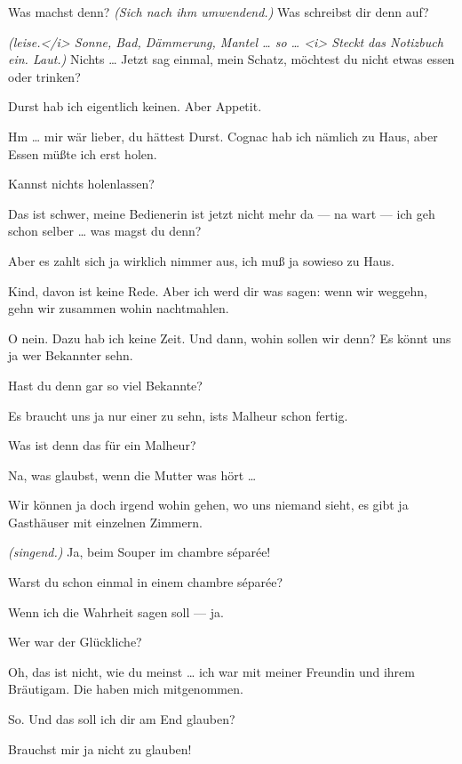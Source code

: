 \documentclass[
	final,
	a4paper,
	ngerman,
	mpinclude = true, %
	twoside = true,
	open = right,
	cleardoublepage = plain,
	DIV = 13,
	BCOR = 1cm,
	titlepage = firstiscover,
	]{scrbook}
\newcommand{\direction}[1]{\textit{(#1)}}
\newcommand{\thecharacter}[1]{\textup{\textsc{#1}}}
\newcommand{\thesuesse}{\thecharacter{Süßes Mädel}}
\newcommand{\thedichter}{\thecharacter{Dichter}}
\newcommand{\character}[1]{\item[#1:]}
\newcommand{\suesse}{\character{\thesuesse}}
\newcommand{\dichter}{\character{\thedichter}}
\begin{document}
\begin{play}
	\suesse
	Was machst denn? \direction{Sich nach ihm umwendend.} Was schreibst dir denn auf?

	\dichter
	\direction{leise.</i> Sonne, Bad, Dämmerung, Mantel \ldots{} so \ldots{} <i> Steckt das Notizbuch ein. Laut.} Nichts \ldots{} Jetzt sag einmal, mein Schatz, möchtest du nicht etwas essen oder trinken?

	\suesse
	Durst hab ich eigentlich keinen. Aber Appetit.

	\dichter
	Hm \ldots{} mir wär lieber, du hättest Durst. Cognac hab ich nämlich zu Haus, aber Essen müßte ich erst holen.

	\suesse
	Kannst nichts holenlassen?

	\dichter
	Das ist schwer, meine Bedienerin ist jetzt nicht mehr da --- na wart --- ich geh schon selber \ldots{} was magst du denn?

	\suesse
	Aber es zahlt sich ja wirklich nimmer aus, ich muß ja sowieso zu Haus.

	\dichter
	Kind, davon ist keine Rede. Aber ich werd dir was sagen: wenn wir weggehn, gehn wir zusammen wohin nachtmahlen.

	\suesse
	O nein. Dazu hab ich keine Zeit. Und dann, wohin sollen wir denn? Es könnt uns ja wer Bekannter sehn.

	\dichter
	Hast du denn gar so viel Bekannte?

	\suesse
	Es braucht uns ja nur einer zu sehn, ists Malheur schon fertig.

	\dichter
	Was ist denn das für ein Malheur?

	\suesse
	Na, was glaubst, wenn die Mutter was hört \ldots{}

	\dichter
	Wir können ja doch irgend wohin gehen, wo uns niemand sieht, es gibt ja Gasthäuser mit einzelnen Zimmern.

	\suesse
	\direction{singend.} Ja, beim Souper im chambre séparée!

	\dichter
	Warst du schon einmal in einem chambre séparée?

	\suesse
	Wenn ich die Wahrheit sagen soll --- ja.

	\dichter
	Wer war der Glückliche?

	\suesse
	Oh, das ist nicht, wie du meinst \ldots{} ich war mit meiner Freundin und ihrem Bräutigam. Die haben mich mitgenommen.

	\dichter
	So. Und das soll ich dir am End glauben?

	\suesse
	Brauchst mir ja nicht zu glauben!


\end{play}
\end{document}
